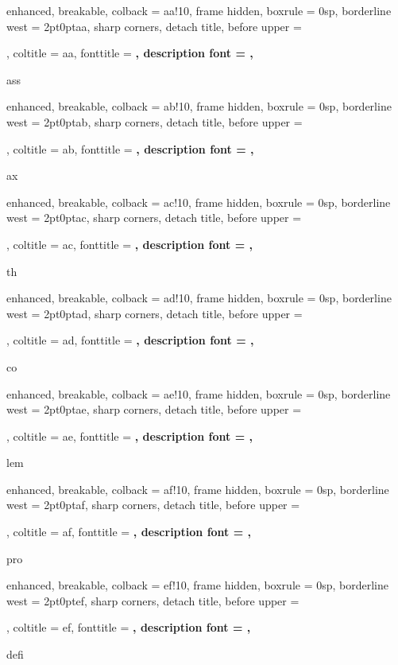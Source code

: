 {
	enhanced, breakable, colback = aa!10,
	frame hidden, boxrule = 0sp,
	borderline west = {2pt}{0pt}{aa},
	sharp corners, detach title,
	before upper = \tcbtitle\par, coltitle = aa,
	fonttitle = \bfseries\sffamily, description font = \mdseries,
}
{ass}

{
	enhanced, breakable, colback = ab!10,
	frame hidden, boxrule = 0sp,
	borderline west = {2pt}{0pt}{ab},
	sharp corners, detach title,
	before upper = \tcbtitle\par, coltitle = ab,
	fonttitle = \bfseries\sffamily, description font = \mdseries,
}
{ax}

{
	enhanced, breakable, colback = ac!10,
	frame hidden, boxrule = 0sp,
	borderline west = {2pt}{0pt}{ac},
	sharp corners, detach title,
	before upper = \tcbtitle\par, coltitle = ac,
	fonttitle = \bfseries\sffamily, description font = \mdseries,
}
{th}

{
	enhanced, breakable, colback = ad!10,
	frame hidden, boxrule = 0sp,
	borderline west = {2pt}{0pt}{ad},
	sharp corners, detach title,
	before upper = \tcbtitle\par, coltitle = ad,
	fonttitle = \bfseries\sffamily, description font = \mdseries,
}
{co}

{
	enhanced, breakable, colback = ae!10,
	frame hidden, boxrule = 0sp,
	borderline west = {2pt}{0pt}{ae},
	sharp corners, detach title,
	before upper = \tcbtitle\par, coltitle = ae,
	fonttitle = \bfseries\sffamily, description font = \mdseries,
}
{lem}

{
	enhanced, breakable, colback = af!10,
	frame hidden, boxrule = 0sp,
	borderline west = {2pt}{0pt}{af},
	sharp corners, detach title,
	before upper = \tcbtitle\par, coltitle = af,
	fonttitle = \bfseries\sffamily, description font = \mdseries,
}
{pro}

{
	enhanced, breakable, colback = ef!10,
	frame hidden, boxrule = 0sp,
	borderline west = {2pt}{0pt}{ef},
	sharp corners, detach title,
	before upper = \tcbtitle\par, coltitle = ef,
	fonttitle = \bfseries\sffamily, description font = \mdseries,
}
{defi}

